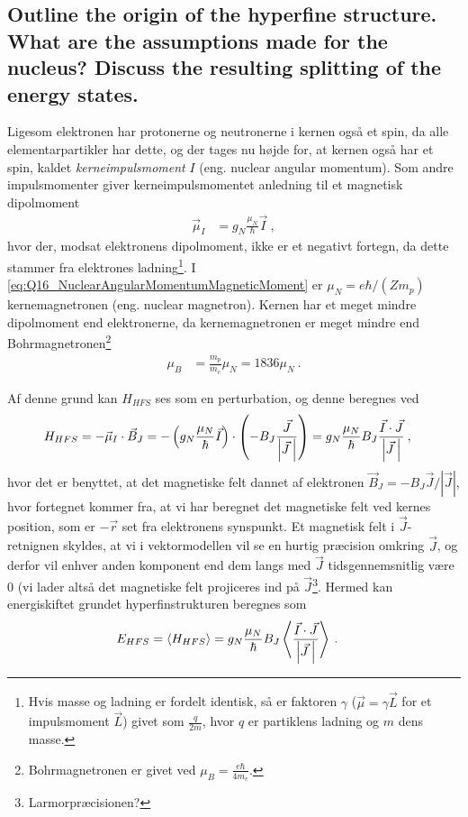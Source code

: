 \subsection{Outline the origin of the hyperfine structure. What are the assumptions made for the nucleus? Discuss the resulting splitting of the energy states.}


Ligesom elektronen har protonerne og neutronerne i kernen også et spin, da alle elementarpartikler har dette, og der tages nu højde for, at kernen også har et spin, kaldet \emph{kerneimpulsmoment} $I$ (eng. nuclear angular momentum). Som andre impulsmomenter giver kerneimpulsmomentet anledning til et magnetisk dipolmoment
\begin{align} \label{eq:Q16_NuclearAngularMomentumMagneticMoment}
	\vec{\mu}_I &= g_N \frac{\mu_N}{\hbar} \vec{I} \: ,
\end{align}
hvor der, modsat elektronens dipolmoment, ikke er et negativt fortegn, da dette stammer fra elektrones ladning\footnote{Hvis masse og ladning er fordelt identisk, så er faktoren $\gamma$ ($\vec{\mu} = \gamma \vec{L}$ for et impulsmoment $\vec{L}$) givet som $\frac{q}{2m}$, hvor $q$ er partiklens ladning og $m$ dens masse.}. I \cref{eq:Q16_NuclearAngularMomentumMagneticMoment} er $\mu_N = e\hbar/(Zm_p)$ kernemagnetronen (eng. nuclear magnetron). Kernen har et meget mindre dipolmoment end elektronerne, da kernemagnetronen er meget mindre end Bohrmagnetronen\footnote{Bohrmagnetronen er givet ved $\mu_B = \frac{e\hbar}{4m_e}$.}
\begin{align}
	\mu_B &= \frac{m_p}{m_e}\mu_N = 1836 \mu_N \: .
\end{align}

Af denne grund kan $H_{HFS}$ ses som en perturbation, og denne beregnes ved
\begin{align} \label{eq:Q16_HyperFineStructureHamiltonStart}
	H_{HFS} &= -\vec{\mu}_I \cdot \vec{B}_J
	= -\left(g_N \frac{\mu_N}{\hbar} \vec{I}\right) \cdot \left(-B_J \frac{\vec{J}}{\abs{\vec{J} \: }}\right)
	= g_N \frac{\mu_N}{\hbar} B_J \frac{\vec{I} \cdot \vec{J}}{\abs{\vec{J} \: }} \: ,
\end{align}
hvor det er benyttet, at det magnetiske felt dannet af elektronen $\vec{B}_J = - B_J \vec{J}/|\vec{J}|$, hvor fortegnet kommer fra, at vi har beregnet det magnetiske felt ved kernes position, som er $-\vec{r}$ set fra elektronens synspunkt. Et magnetisk felt i $\vec{J}$-retnignen skyldes, at vi i vektormodellen vil se en hurtig præcision omkring $\vec{J}$, og derfor vil enhver anden komponent end dem langs med $\vec{J}$ tidsgennemsnitlig være $0$ (vi lader altså det magnetiske felt projiceres ind på $\vec{J}$\footnote{Larmorpræcisionen?}. Hermed kan energiskiftet grundet hyperfinstrukturen beregnes som
\begin{align} \label{eq:Q16_HyperFineStructureEnergyChangeStart}
    E_{HFS} &= \Braket{H_{HFS}} = g_N \frac{\mu_N}{\hbar} B_J \Braket{\frac{\vec{I} \cdot \vec{J}}{\abs{\vec{J} \: }}} \: .
\end{align}

